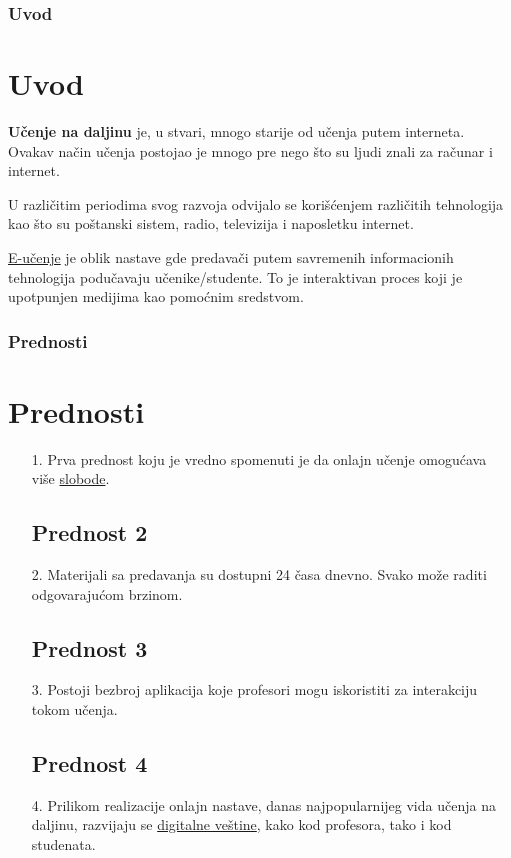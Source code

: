 \documentclass[11pt]{beamer}
\begin{document}
\begin{frame}
		\frametitle{Uvod}
		\section{Uvod}
		
		\small{	
    \textbf{Učenje na daljinu} je, u stvari, mnogo starije od učenja putem interneta. Ovakav način učenja postojao je mnogo pre nego što su ljudi znali za računar i internet.
  
    U različitim periodima svog razvoja odvijalo se korišćenjem različitih tehnologija kao što su poštanski sistem, radio, televizija i naposletku internet.
   
    \underline{E-učenje} je oblik nastave gde predavači putem savremenih informacionih tehnologija podučavaju učenike/studente. To je interaktivan proces koji je upotpunjen medijima kao pomoćnim sredstvom.}
\end{frame}
	
	
\begin{frame}
		\frametitle{Prednosti}
		\section{Prednosti}
  \begin{itemize}
		
		\subsection{Prednost 1}\item[1.]{Prva prednost koju je vredno spomenuti je da onlajn učenje omogućava više \underline{slobode}.}
        \subsection{Prednost 2}\item[2.]{Materijali sa predavanja su dostupni 24 časa dnevno.
        Svako može raditi odgovarajućom brzinom.}
         \subsection{Prednost 3}\item[3.]{Postoji bezbroj aplikacija koje profesori mogu iskoristiti za interakciju tokom učenja.}
         \subsection{Prednost 4}\item[4.]{Prilikom realizacije onlajn nastave, danas najpopularnijeg vida učenja na daljinu, razvijaju se \underline{digitalne veštine}, kako kod profesora, tako i kod studenata.}
         \end{itemize}
         
\end{frame}
\end{document}
